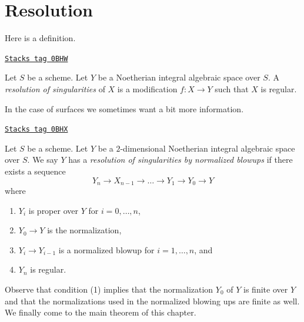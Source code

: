 \section{Resolution}
\label{spaces-resolve-section-resolution}
Here is a definition.

\begin{definition}[Resolution]
\label{spaces-resolve-definition-resolution}
\href{https://stacks.math.columbia.edu/tag/0BHW}{\texttt{Stacks tag 0BHW}}

Let $S$ be a scheme. Let $Y$ be a Noetherian integral algebraic space over
$S$. A {\it resolution of singularities} of $X$ is a modification
$f : X \to Y$ such that $X$ is regular.
\end{definition}

In the case of surfaces we sometimes want a bit more information.

\begin{definition}
\label{spaces-resolve-definition-resolution-surface}
\href{https://stacks.math.columbia.edu/tag/0BHX}{\texttt{Stacks tag 0BHX}}

Let $S$ be a scheme. Let $Y$ be a $2$-dimensional Noetherian integral
algebraic space over $S$. We say $Y$ has a
{\it resolution of singularities by normalized blowups}
if there exists a sequence
$$
Y_n \to X_{n - 1} \to \ldots \to Y_1 \to Y_0 \to Y
$$
where
\begin{enumerate}
\item $Y_i$ is proper over $Y$ for $i = 0, \ldots, n$,
\item $Y_0 \to Y$ is the normalization,
\item $Y_i \to Y_{i - 1}$ is a normalized blowup for $i = 1, \ldots, n$, and
\item $Y_n$ is regular.
\end{enumerate}
\end{definition}

Observe that condition (1) implies that the normalization
$Y_0$ of $Y$ is finite over $Y$ and that the normalizations
used in the normalized blowing ups are finite as well.
We finally come to the main theorem of this chapter.

